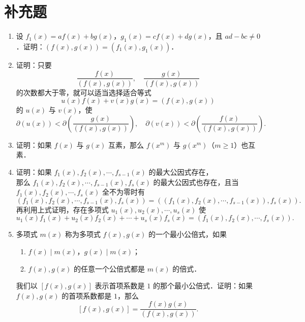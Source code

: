 \section{补充题}
\begin{enumerate}
  \item 设 $f_1(x)=af(x)+bg(x)$，$g_1(x)=cf(x)+dg(x)$，且 $ad-bc\neq 0$．证明：$(f(x),g(x))=(f_1(x),g_1(x))$．
  \ansproof
  \item 证明：只要
  \[
    \frac{f(x)}{(f(x),g(x))},\quad \frac{g(x)}{(f(x),g(x))}
  \]
  的次数都大于零，就可以适当选择适合等式
  \[
    u(x)f(x)+v(x)g(x)=(f(x),g(x))
  \]
  的 $u(x)$ 与 $v(x)$，使
  \[
    \partial(u(x))<\partial\left(\frac{g(x)}{(f(x),g(x))}\right),\quad
    \partial(v(x))<\partial\left(\frac{f(x)}{(f(x),g(x))}\right).
  \]
  \ansproof
  \item 证明：如果 $f(x)$ 与 $g(x)$ 互素，那么 $f(x^m)$ 与 $g(x^m)$（$m\geq 1$）也互素．
  \ansproof
  \item \begin{minipage}[t]{\linewidth}
  证明：如果 $f_1(x),\allowbreak f_2(x),\allowbreak \cdots,\allowbreak f_{s-1}(x)$ 的最大公因式存在，\\
  那么 $f_1(x),\allowbreak f_2(x),\allowbreak \cdots,\allowbreak f_{s-1}(x),\allowbreak f_s(x)$ 的最大公因式也存在，且当 $f_1(x),\allowbreak f_2(x),\allowbreak \cdots,\allowbreak f_s(x)$ 全不为零时有
  \[
    (f_1(x),f_2(x),\cdots,f_{s-1}(x),f_s(x))=((f_1(x),f_2(x),\cdots,f_{s-1}(x)),f_s(x)).
  \]
  再利用上式证明，存在多项式 $u_1(x),u_2(x),\cdots,u_s(x)$ 使
  \[
    u_1(x)f_1(x)+u_2(x)f_2(x)+\cdots+u_s(x)f_s(x)=(f_1(x),f_2(x),\cdots,f_s(x)).
  \]
  \end{minipage}
  \ansproof
  \item 多项式 $m(x)$ 称为多项式 $f(x),g(x)$ 的一个最小公倍式，如果
  \begin{enumerate}
    \item $f(x)\mid m(x)$，$g(x)\mid m(x)$；
    \item $f(x),g(x)$ 的任意一个公倍式都是 $m(x)$ 的倍式．
  \end{enumerate}
  我们以 $[f(x),g(x)]$ 表示首项系数是 $1$ 的那个最小公倍式．证明：如果 $f(x),g(x)$ 的首项系数都是 $1$，那么
  \[
    [f(x),g(x)]=\frac{f(x)g(x)}{(f(x),g(x))}.
  \]
  \ansproof


\end{enumerate}
